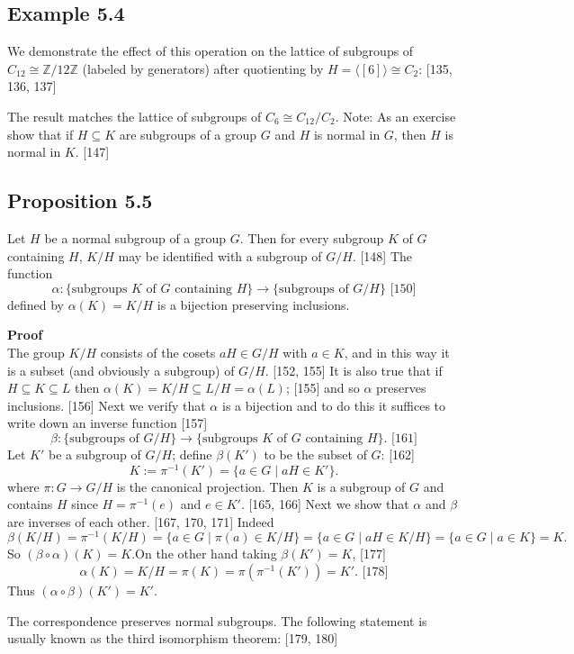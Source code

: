 \subsection*{Example 5.4}
We demonstrate the effect of this operation on the lattice of subgroups of $C_{12} \cong \mathbb{Z}/12\mathbb{Z}$ (labeled by generators) after quotienting by $H = \langle [6] \rangle \cong C_2$: [135, 136, 137]

The result matches the lattice of subgroups of $C_6 \cong C_{12}/C_2$.
Note: As an exercise show that if $H \subseteq K$ are subgroups of a group $G$ and $H$ is normal in $G$, then $H$ is normal in $K$. [147]

\subsection*{Proposition 5.5}
Let $H$ be a normal subgroup of a group $G$.  Then for every subgroup $K$ of $G$ containing $H$, $K/H$ may be identified with a subgroup of $G/H$. [148] The function
$$\alpha: \{\text{subgroups } K \text{ of } G \text{ containing } H\} \to \{\text{subgroups of } G/H\} \text{ [150]}$$
defined by $\alpha(K) = K/H$ is a bijection preserving inclusions.

\textbf{Proof} \\
The group $K/H$ consists of the cosets $aH \in G/H$ with $a \in K$, and in this way it is a subset (and obviously a subgroup) of $G/H$. [152, 155] It is also true that if $H \subseteq K \subseteq L$ then $\alpha(K) = K/H \subseteq L/H = \alpha(L)$; [155] and so $\alpha$ preserves inclusions. [156] Next we verify that $\alpha$ is a bijection and to do this it suffices to write down an inverse function [157]
$$\beta: \{\text{subgroups of } G/H\} \to \{\text{subgroups } K \text{ of } G \text{ containing } H\}. \text{ [161]}$$
Let $K'$ be a subgroup of $G/H$;  define $\beta(K')$ to be the subset of $G$: [162]
$$K := \pi^{-1}(K') = \{a \in G \mid aH \in K'\}. $$
where $\pi: G \to G/H$ is the canonical projection.  Then $K$ is a subgroup of $G$ and contains $H$ since $H = \pi^{-1}(e)$ and $e \in K'$. [165, 166] Next we show that $\alpha$ and $\beta$ are inverses of each other. [167, 170, 171] Indeed
$$\beta(K/H) = \pi^{-1}(K/H) = \{a \in G \mid \pi(a) \in K/H\} = \{a \in G \mid aH \in K/H\} = \{a \in G \mid a \in K\} = K. $$
So $(\beta \circ \alpha)(K) = K$.On the other hand taking $\beta(K') = K$, [177]
$$\alpha(K) = K/H = \pi(K) = \pi(\pi^{-1}(K')) = K'. \text{ [178]}$$
Thus $(\alpha \circ \beta)(K') = K'$.

The correspondence preserves normal subgroups. The following statement is usually known as the third isomorphism theorem: [179, 180]

